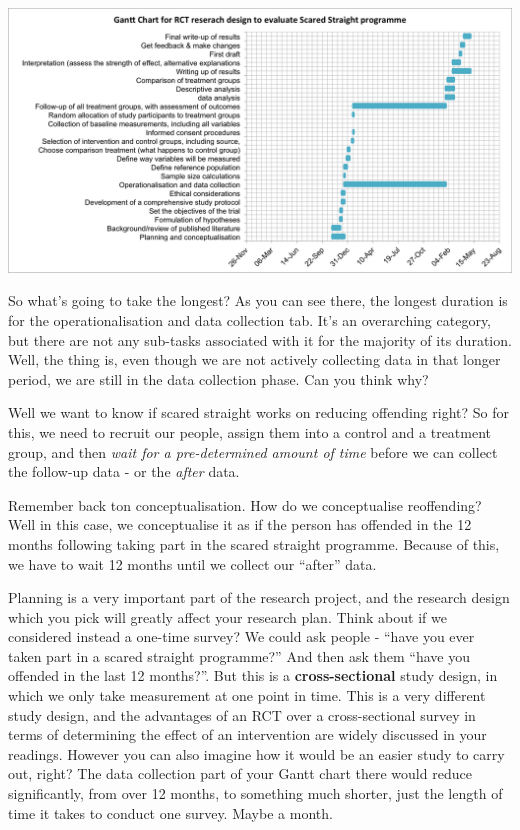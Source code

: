 \documentclass[]{book}
\theoremstyle{definition}
\theoremstyle{definition}
\theoremstyle{definition}
\theoremstyle{remark}
\begin{document}
\includegraphics{imgs/final_gantt.png}

So what's going to take the longest? As you can see there, the longest
duration is for the operationalisation and data collection tab. It's an
overarching category, but there are not any sub-tasks associated with it
for the majority of its duration. Well, the thing is, even though we are
not actively collecting data in that longer period, we are still in the
data collection phase. Can you think why?

Well we want to know if scared straight works on reducing offending
right? So for this, we need to recruit our people, assign them into a
control and a treatment group, and then \emph{wait for a pre-determined
amount of time} before we can collect the follow-up data - or the
\emph{after} data.

Remember back ton conceptualisation. How do we conceptualise
reoffending? Well in this case, we conceptualise it as if the person has
offended in the 12 months following taking part in the scared straight
programme. Because of this, we have to wait 12 months until we collect
our ``after'' data.

Planning is a very important part of the research project, and the
research design which you pick will greatly affect your research plan.
Think about if we considered instead a one-time survey? We could ask
people - ``have you ever taken part in a scared straight programme?''
And then ask them ``have you offended in the last 12 months?''. But this
is a \textbf{cross-sectional} study design, in which we only take
measurement at one point in time. This is a very different study design,
and the advantages of an RCT over a cross-sectional survey in terms of
determining the effect of an intervention are widely discussed in your
readings. However you can also imagine how it would be an easier study
to carry out, right? The data collection part of your Gantt chart there
would reduce significantly, from over 12 months, to something much
shorter, just the length of time it takes to conduct one survey. Maybe a
month.
\end{document}
